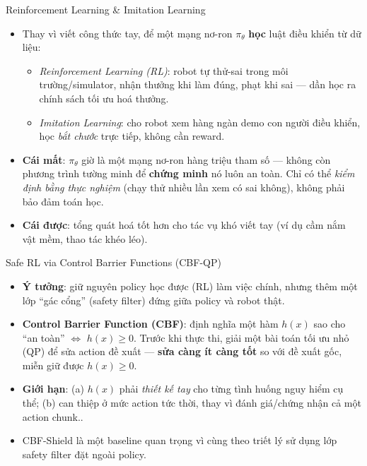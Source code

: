 \documentclass[aspectratio=169]{beamer}
\begin{document}
\begin{frame}[t,shrink=8]{Reinforcement Learning \& Imitation Learning}
\begin{itemize}
    \item Thay vì viết công thức tay, để một mạng nơ-ron $\pi_\theta$ \textbf{học} luật điều khiển từ dữ liệu:
    \begin{itemize}
        \item \emph{Reinforcement Learning (RL)}: robot tự thử-sai trong môi trường/simulator, nhận thưởng khi làm đúng, phạt khi sai --- dần học ra chính sách tối ưu hoá thưởng.
        \item \emph{Imitation Learning}: cho robot xem hàng ngàn demo con người điều khiển, học \emph{bắt chước} trực tiếp, không cần reward.
    \end{itemize}
    \item \textbf{Cái mất}: $\pi_\theta$ giờ là một mạng nơ-ron hàng triệu tham số --- không còn phương trình tường minh để \textbf{chứng minh} nó luôn an toàn. Chỉ có thể \emph{kiểm định bằng thực nghiệm} (chạy thử nhiều lần xem có sai không), không phải bảo đảm toán học.
    \item \textbf{Cái được}: tổng quát hoá tốt hơn cho tác vụ khó viết tay (ví dụ cầm nắm vật mềm, thao tác khéo léo).
\end{itemize}
\end{frame}

\begin{frame}[t,shrink=8]{Safe RL via Control Barrier Functions (CBF-QP)}
\begin{itemize}
    \item \textbf{Ý tưởng}: giữ nguyên policy học được (RL) làm việc chính, nhưng thêm một lớp ``gác cổng'' (safety filter) đứng giữa policy và robot thật.
    \item \textbf{Control Barrier Function (CBF)}: định nghĩa một hàm $h(x)$ sao cho ``an toàn'' $\Leftrightarrow$ $h(x)\ge 0$. Trước khi thực thi, giải một bài toán tối ưu nhỏ (QP) để sửa action đề xuất --- \textbf{sửa càng ít càng tốt} so với đề xuất gốc, miễn giữ được $h(x)\ge 0$.
    \item \textbf{Giới hạn}: (a) $h(x)$ phải \emph{thiết kế tay} cho từng tình huống nguy hiểm cụ thể; (b) can thiệp ở mức action tức thời, thay vì đánh giá/chứng nhận cả một action chunk..
    \item CBF-Shield là một baseline quan trọng vì cùng theo triết lý sử dụng lớp safety filter đặt ngoài policy.
\end{itemize}
\end{frame}
\end{document}
